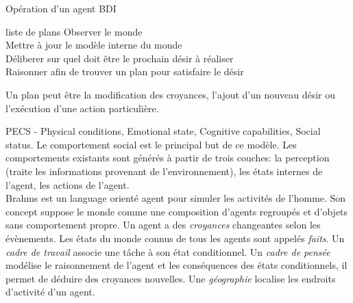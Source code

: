 \documentclass[11pt]{article}
\begin{document}
\begin{algorithm2e}
\caption{Opération d'un agent BDI}\label{alg:gauss-seidel}
\KwIn
{%
 liste de plans
}
{
   Observer le monde \\
   Mettre à jour le modèle interne du monde \\
   Déliberer sur quel doit être le prochain désir à réaliser \\
   Raisonner afin de trouver un plan pour satisfaire le désir
}
\end{algorithm2e}

Un plan peut être la modification des croyances, l'ajout d'un nouveau désir ou l'exécution d'une action particulière. 

PECS - Physical conditions, Emotional state, Cognitive capabilities, Social status. Le comportement social est le principal but de ce modèle. Les comportements existants sont générés à partir de trois couches:    la perception (traite les informations provenant de l'environnement), les états internes de l'agent, les actions de l'agent.\\
Brahms est un language orienté agent pour simuler les activités de l'homme. Son concept suppose le monde comme une composition d'agents regroupés et d'objets sans comportement propre. Un agent a des \textit{croyances} changeantes selon les évènements. Les états du monde connus de tous les agents sont appelés \textit{faits}. Un \textit{cadre de travail} associe une tâche à son état conditionnel. Un \textit{cadre de pensée} modélise le raisonnement de l'agent et les conséquences des états conditionnels, il permet de déduire des croyances nouvelles. Une \textit{géographie} localise les endroits d'activité d'un agent. 
\end{document}
